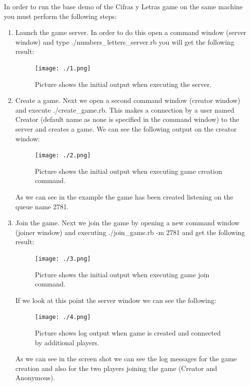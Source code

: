\documentclass[a4paper,10pt,titlepage]{article}
\begin{document}
\par In order to run the base demo of the Cifras y Letras game on the same machine you must perform the following steps:
\begin{enumerate}
	\item Launch the game server. In order to do this open a command window (server window) and type ./numbers\_letters\_server.rb you will get the following result:
	\par \begin{figure}[H]
		\centerline{%
		\texttt{[image: ./1.png]}
		}
		\caption[Numbers letters initial execution]{Picture shows the initial output when executing the server.}
	\end{figure}
	
	\item Create a game. Next we open a second command window (creator window) and execute ./create\_game.rb. This makes a connection by a user named Creator (default name as none is specified in the command window) to the server and creates a game. We can see the following output on the creator window: 
	\par \begin{figure}[H]
		\centerline{%
		\texttt{[image: ./2.png]}
		}
		\caption[Create game initial execution]{Picture shows the initial output when executing game creation command.}
	\end{figure}
	
	\par As we can see in the example the game has been created listening on the queue name 2781.
	
	\item Join the game. Next we join the game by opening a new command window (joiner window) and executing ./join\_game.rb -m 2781 and get the following result:
	\par \begin{figure}[H]
		\centerline{%
		\texttt{[image: ./3.png]}
		}
		\caption[Join game initial execution]{Picture shows the initial output when executing game join command.}
	\end{figure}
	\par If we look at this point the server window we can see the following:
	\par \begin{figure}[H]
		\centerline{%
		\texttt{[image: ./4.png]}
		}
		\caption[Game joined by players]{Picture shows log output when game is created and connected by additional players.}
	\end{figure}
	\par As we can see in the screen shot we can see the log messages for the game creation and also for the two players joining the game (Creator and Anonymous).
	

\end{enumerate}
\end{document}
